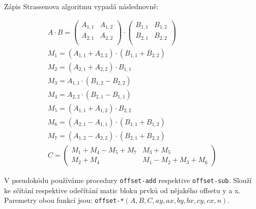 \documentclass[thesis=B,czech]{FITthesis}[2012/06/26]
\begin{document}
Zápis Strassenova algoritmu vypadá následnovně:	

\begin{align}
A \cdot B = \begin{pmatrix}
 A_{1,1} & A_{1,2} \\
 A_{2,1} & A_{2,2} \\
\end{pmatrix} \cdot \begin{pmatrix}
 B_{1,1} & B_{1,2} \\
 B_{2,1} & B_{2,2} \\
\end{pmatrix} \\
M_{1} = (A_{1,1} + A_{2,2}) \cdot (B_{1,1} + B_{2,2}) \\
M_{2} = (A_{2,1} + A_{2,2}) \cdot B_{1,1} \\
M_{3} = A_{1,1} \cdot (B_{1,2} - B_{2,2}) \\
M_{4} = A_{2,2} \cdot (B_{2,1} - B_{1,1}) \\
M_{5} = (A_{1,1} + A_{1,2}) \cdot B_{2,2} \\
M_{6} = (A_{2,1} - A_{1,1}) \cdot (B_{1,1} + B_{1,2}) \\
M_{7} = (A_{1,2} - A_{2,2}) \cdot (B_{2,1} + B_{2,2}) \\
C = \begin{pmatrix}
 M_{1} + M_{4} - M_{5} + M_{7} & M_{3} + M_{5} \\
 M_{2} + M_{4} & M_{1} - M_{2} + M_{3} + M_{6}
\end{pmatrix}
\end{align}

V pseudokódu používáme procedury \texttt{offset-add} respektive \texttt{offset-sub}. Slouží ke sčítání respektive odečítání matic bloku prvků od nějakého offsetu y a x. Paremetry obou funkcí jsou: \texttt{offset-*}$(A,B,C,ay,ax,by,bx,cy,cx,n)$. 
\end{document}

